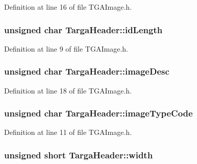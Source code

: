 Definition at line 16 of file T\-G\-A\-Image.\-h.

\hypertarget{struct_targa_header_a524d6939e514516a0ebd484f6aa6e19b}{
\subsubsection[{id\-Length}]{\setlength{\rightskip}{0pt plus 5cm}unsigned char Targa\-Header\-::id\-Length}}\label{struct_targa_header_a524d6939e514516a0ebd484f6aa6e19b}


Definition at line 9 of file T\-G\-A\-Image.\-h.

\hypertarget{struct_targa_header_ae575637b398fc5dab73ebe83bd28a217}{
\subsubsection[{image\-Desc}]{\setlength{\rightskip}{0pt plus 5cm}unsigned char Targa\-Header\-::image\-Desc}}\label{struct_targa_header_ae575637b398fc5dab73ebe83bd28a217}


Definition at line 18 of file T\-G\-A\-Image.\-h.

\hypertarget{struct_targa_header_af1dbc0ea2e05d42678ff51c6cc43b630}{
\subsubsection[{image\-Type\-Code}]{\setlength{\rightskip}{0pt plus 5cm}unsigned char Targa\-Header\-::image\-Type\-Code}}\label{struct_targa_header_af1dbc0ea2e05d42678ff51c6cc43b630}


Definition at line 11 of file T\-G\-A\-Image.\-h.

\hypertarget{struct_targa_header_a3725c3553a93e16ba987c2b71e3c2b8b}{
\subsubsection[{width}]{\setlength{\rightskip}{0pt plus 5cm}unsigned short Targa\-Header\-::width}}\label{struct_targa_header_a3725c3553a93e16ba987c2b71e3c2b8b}


